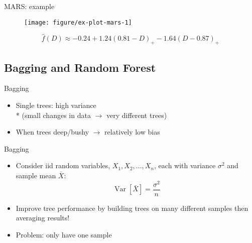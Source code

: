 \documentclass{beamer}
\begin{document}
\begin{frame}[t]{MARS: example}

\begin{figure}[!htbp]
\begin{center}
  \texttt{[image: figure/ex-plot-mars-1]}
\end{center}
\end{figure}
%
\begin{equation*}
  \label{eq:mars-eqn}
  \hat{f}(D) \approx -0.24 + 1.24 (0.81 - D)_{+} -1.64 (D - 0.87)_{+}
\end{equation*}

\end{frame}


\subsection{Bagging and Random Forest} %
\label{sub:bagging_and_random}

\begin{frame}{Bagging}
  
  \begin{itemize}[<+->]
    \item Single trees: high variance \\* 
    (small changes in data $\rightarrow$ very different trees)
    \item When trees deep/bushy $\rightarrow$ relatively low bias 
  \end{itemize}
\end{frame}

\begin{frame}{Bagging}
  
  \begin{itemize}[<+->]
    \item Consider iid random variables, $X_{1}, X_{2}, \ldots, X_{n}$, each with variance $\sigma^2$ and sample mean $\bar{X}$:
  \begin{equation*}
    \operatorname{Var}[\bar{X}] = \frac{\sigma^2}{n}
  \end{equation*}
  \item Improve tree performance by building trees on many different samples then averaging results!
  \item Problem: only have one sample
  \end{itemize}
\end{frame}
\end{document}
